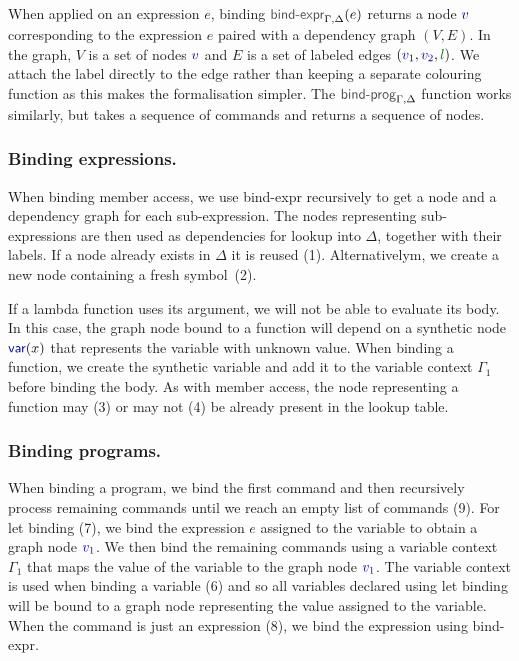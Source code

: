 \documentclass[acmsmall,anonymous,fleqn]{acmart}\settopmatter{printfolios=false,printccs=false,printacmref=false}
\theoremstyle{plain}
\theoremstyle{definition}
\newcommand{\ident}[1]{\textnormal{\textcolor{idclr}{\sffamily #1}}}
\newcommand{\kvd}[1]{\textnormal{\textcolor{kvdclr}{\sffamily #1}}}
\newcommand{\bndclr}[1]{\textcolor{kvdclr}{#1}}
\newcommand{\blblclr}[1]{\textcolor{numclr}{#1}}
\newcommand{\bnd}[1]{\textnormal{\textcolor{kvdclr}{\sffamily #1}}}
\begin{document}
When applied on an expression $e$, binding $\ident{bind-expr}_{\Gamma,\Delta}(e)$ returns
a node $\bndclr{v}$ corresponding to the expression $e$ paired with a dependency graph $(V, E)$.
In the graph, $V$ is a set of nodes $\bndclr{v}$ and $E$ is a set of labeled edges
$(\bndclr{v_1}, \bndclr{v_2}, \blblclr{l})$. We attach the label directly to the edge rather than
keeping a separate colouring function as this makes the formalisation simpler.
The $\ident{bind-prog}_{\Gamma,\Delta}$ function works similarly, but takes a sequence of
commands and returns a sequence of nodes.

\subsubsection{Binding expressions.} When binding member access, we use \ident{bind-expr} recursively
to get a node and a dependency graph for each sub-expression. The nodes representing sub-expressions are
then used as dependencies for lookup into $\Delta$, together with their labels. If a node already
exists in $\Delta$ it is reused (1). Alternativelym, we create a new node containing a fresh symbol~(2).

If a lambda function uses its argument, we will not be able to evaluate its body. In this case, the
graph node bound to a function will depend on a synthetic node $\bnd{var}(x)$ that represents the
variable with unknown value. When binding a function, we create the synthetic variable and add it
to the variable context $\Gamma_1$ before binding the body. As with member access, the node
representing a function may (3) or may not (4) be already present in the lookup table.

\subsubsection{Binding programs.} When binding a program, we bind the first command and then
recursively process remaining commands until we reach an empty list of commands (9).
For \kvd{let} binding (7), we bind the expression $e$ assigned to the variable to obtain a
graph node $\bndclr{v_1}$. We then bind the remaining commands using a variable context $\Gamma_1$
that maps the value of the variable to the graph node $\bndclr{v_1}$. The variable context is used
when binding a variable (6) and so all variables declared using \kvd{let} binding will be bound to
a graph node representing the value assigned to the variable. When the command is just an
expression (8), we bind the expression using \ident{bind-expr}.
\end{document}

